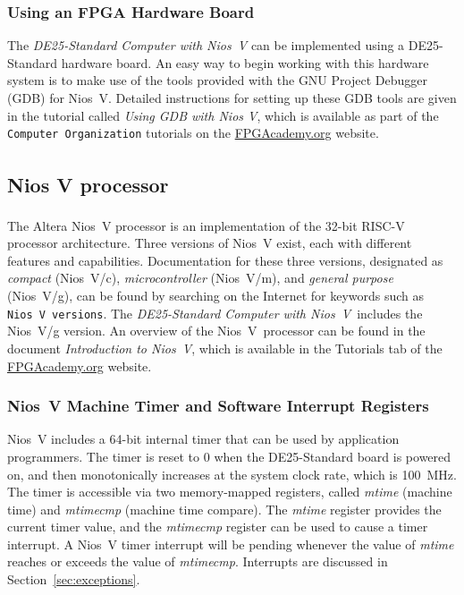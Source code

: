 \documentclass[11pt, twoside, pdftex]{article}
\newcommand{\DEBoard}{DE25-Standard}
\newcommand{\systemNameFull}{DE25-Standard Computer with Nios~V}
\newcommand{\processor}{Nios~V}
\begin{document}
\subsubsection {Using an FPGA Hardware Board}

The {\it \systemNameFull} can be implemented using a {\DEBoard} hardware
board.  An easy way to begin working with this hardware system is to make use of the tools
provided with the GNU Project Debugger (GDB) for Nios~V. Detailed instructions for setting up 
these GDB tools are given in the tutorial called {\it Using GDB with Nios V}, which is available
as part of the \texttt{Computer Organization} tutorials on the 
{\small \href{https://www.fpgacademy.org/tutorials.html} {FPGAcademy.org}} website.

\subsection{Nios\textsuperscript{\textregistered} V processor}
\label{sec:niosV}
The Altera Nios\textsuperscript{\textregistered}~V processor 
is an implementation of the 32-bit RISC-V processor architecture. Three versions of 
Nios~V exist, each with different features and capabilities.  Documentation for these 
three versions, designated as {\it compact} (Nios~V/c), {\it microcontroller} (Nios~V/m),
and {\it general purpose} (Nios~V/g), can be found by searching on the Internet for keywords 
such as \texttt{Nios~V versions}. The {\it \systemNameFull}~includes 
the Nios~V/g version. An overview of the \processor~processor can be found in the 
document {\it Introduction to \processor}, which is available in the 
Tutorials tab of the 
{\small \href{https://www.fpgacademy.org/tutorials.html} {FPGAcademy.org}} website.

\subsubsection{Nios~V Machine Timer and Software Interrupt Registers}
\label{sec:mtimer}
Nios~V includes a 64-bit internal timer that can be used by application programmers. 
The timer is reset to 0 when the {\DEBoard} board is powered on, and then monotonically
increases at the system clock rate, which is 100~MHz. The timer is accessible via two 
memory-mapped registers, 
called {\it mtime} (machine time) and {\it mtimecmp} (machine time compare). The 
{\it mtime} register provides the current timer value, and the {\it mtimecmp} register 
can be used to cause a timer interrupt. A Nios~V timer interrupt will be pending whenever 
the value of {\it mtime} reaches or exceeds the value of {\it mtimecmp}. Interrupts are 
discussed in Section~\ref{sec:exceptions}.
\end{document}
